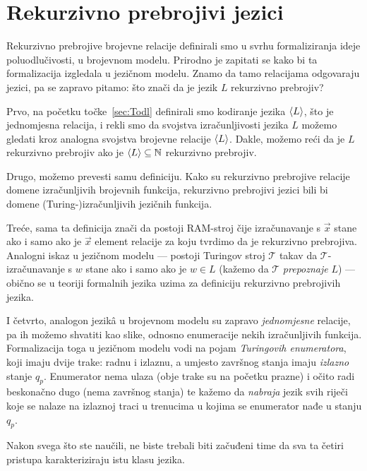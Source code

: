 \section{Rekurzivno prebrojivi jezici}\label{sec:relang}

Rekurzivno prebrojive brojevne relacije definirali smo u svrhu formaliziranja ideje poluodlučivosti, u brojevnom modelu. Prirodno je zapitati se kako bi ta formalizacija izgledala u jezičnom modelu. Znamo da tamo relacijama odgovaraju jezici, pa se zapravo pitamo: što znači da je jezik $L$ rekurzivno prebrojiv?

Prvo, na početku točke~\ref{sec:Todl} definirali smo kodiranje jezika $\langle L\rangle$, što je jednomjesna relacija, i rekli smo da svojstva izračunljivosti jezika $L$ možemo gledati kroz analogna svojstva brojevne relacije $\langle L\rangle$. Dakle, možemo reći da je $L$ rekurzivno prebrojiv ako je $\langle L\rangle\subseteq{\mathbb N}$ rekurzivno prebrojiv.

Drugo, možemo prevesti samu definiciju. Kako su rekurzivno prebrojive relacije domene izračunljivih brojevnih funkcija, rekurzivno prebrojivi jezici bili bi domene (Turing-)izračunljivih jezičnih funkcija.

Treće, sama ta definicija znači da postoji RAM-stroj čije izračunavanje s $\vec x$ stane ako i samo ako je $\vec x$ element relacije za koju tvrdimo da je rekurzivno prebrojiva. Analogni iskaz u jezičnom modelu --- postoji Turingov stroj $\mathcal T$ takav da $\mathcal T$-izračunavanje s $w$ stane ako i samo ako je $w\in L$ (kažemo da $\mathcal T$ \emph{prepoznaje} $L$) --- obično se u teoriji formalnih jezika uzima za definiciju rekurzivno prebrojivih jezika.

I četvrto, analogon jezik\^a u brojevnom modelu su zapravo \emph{jednomjesne} relacije, pa ih možemo shvatiti kao slike, odnosno enumeracije nekih izračunljivih funkcija. Formalizacija toga u jezičnom modelu vodi na pojam \emph{Turingovih enumeratora}, koji imaju dvije trake: radnu i izlaznu, a umjesto završnog stanja imaju \emph{izlazno} stanje $q_p$. Enumerator nema ulaza (obje trake su na početku prazne) i očito radi beskonačno dugo (nema završnog stanja) te kažemo da \emph{nabraja} jezik svih riječi koje se nalaze na izlaznoj traci u trenucima u kojima se enumerator nađe u stanju $q_p$.

Nakon svega što ste naučili, ne biste trebali biti začuđeni time da sva ta četiri pristupa karakteriziraju istu klasu jezika.

